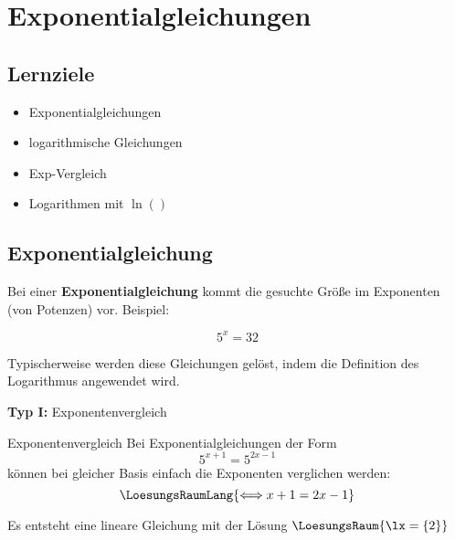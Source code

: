 

\section{Exponentialgleichungen}

\subsection*{Lernziele}

\begin{itemize}
\item Exponentialgleichungen
  \item logarithmische Gleichungen 
\item Exp-Vergleich
\item Logarithmen mit $\ln()$
\end{itemize}


\newpage


\subsection{Exponentialgleichung}
Bei einer \textbf{Exponentialgleichung} kommt die gesuchte Größe im
Exponenten (von Potenzen) vor. Beispiel:

$$5^x = 32$$

Typischerweise werden diese Gleichungen gelöst, indem die Definition
des Logarithmus angewendet wird.

\textbf{Typ I:} Exponentenvergleich\\

\begin{rezept}{Exponentenvergleich}{}
Bei Exponentialgleichungen der Form $$5^{x+1} = 5^{2x-1}$$ können bei
gleicher Basis einfach die Exponenten verglichen werden:
$$\LoesungsRaumLang{\Longleftrightarrow x+1=2x-1}$$

Es entsteht eine lineare Gleichung mit der Lösung $\LoesungsRaum{\lx = \{2\}}$
\end{rezept}

